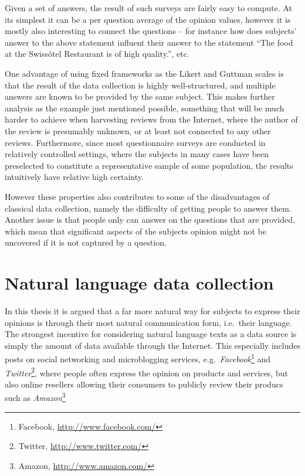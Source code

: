Given a set of answers, the result of such surveys are fairly easy to compute. At its simplest it can be a per question average of the opinion values, however it is mostly also interesting to connect the questions -- for instance how does subjects' answer to the above statement influent their answer to the statement ``The food at the Swissôtel Restaurant is of high quality.'', etc. 

One advantage of using fixed frameworks as the Likert and Guttman scales is that the result of the data collection is highly well-structured, and multiple answers are known to be provided by the same subject. This makes further analysis as the example just mentioned possible, something that will be much harder to achieve when harvesting reviews from the Internet, where the author of the review is presumably unknown, or at least not connected to any other reviews. Furthermore, since most questionnaire surveys are conducted in relatively controlled settings, where the subjects in many cases have been preselected to constitute a representative sample of some population, the results intuitively have relative high certainty.

However these properties also contributes to some of the disadvantages of classical data collection, namely the difficulty of getting people to answer them. Another issue is that people only can answer on the questions that are provided, which mean that significant aspects of the subjects opinion might not be uncovered if it is not captured by a question.

\section{Natural language data collection}
\label{sec:naturalDataCollection}

In this thesis it is argued that a far more natural way for subjects to express their opinions is through their most natural communication form, i.e.\ their language. The strongest incentive for considering natural language texts as a data source is simply the amount of data available through the Internet. This especially includes posts on social networking and microblogging services, e.g.\ \emph{Facebook}\footnote{Facebook, \url{http://www.facebook.com/}} and \emph{Twitter}\footnote{Twitter, \url{http://www.twitter.com/}}, where people often express the opinion on products and services, but also online resellers allowing their consumers to publicly review their producs such as \emph{Amazon}\footnote{Amazon, \url{http://www.amazon.com/}} 

